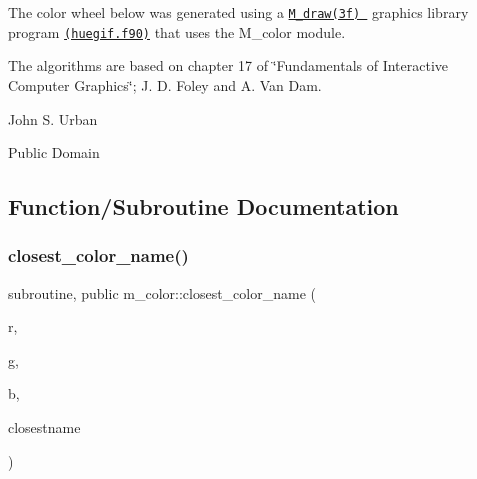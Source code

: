 \begin{DoxyDescription}
The color wheel below was generated using a \href{BOOK_M_draw.html}{\tt M\+\_\+draw(3f) } graphics library program \href{../test/demos/huegif.f90}{\tt (huegif.\+f90)} that uses the M\+\_\+color module. 



\begin{center}  \end{center} 




\item[R\+E\+F\+E\+R\+E\+N\+C\+ES]The algorithms are based on chapter 17 of \char`\"{}\+Fundamentals of Interactive Computer Graphics\char`\"{}; J. D. Foley and A. Van Dam. 


\item[A\+U\+T\+H\+OR ]

John S. Urban




\item[L\+I\+C\+E\+N\+SE ]

Public Domain




\end{DoxyDescription}

\subsection{Function/\+Subroutine Documentation}
\mbox{\label{namespacem__color_acad72628ee0b77cf87f40cd46734fb18}} 
\subsubsection{\texorpdfstring{closest\+\_\+color\+\_\+name()}{closest\_color\_name()}}
{\footnotesize\ttfamily subroutine, public m\+\_\+color\+::closest\+\_\+color\+\_\+name (\begin{DoxyParamCaption}\item[{real, intent(in)}]{r,  }\item[{real, intent(in)}]{g,  }\item[{real, intent(in)}]{b,  }\item[{character(len=$\ast$), intent(out)}]{closestname }\end{DoxyParamCaption})}



